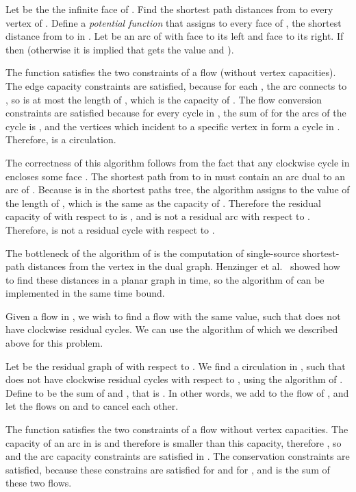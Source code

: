 \documentclass[a4paper,11pt]{article}
\begin{document}
Let  be
the the infinite face of . Find
the shortest path distances from  to every vertex of .
Define a \emph{potential function}  that assigns to every face
 of , the shortest distance from  to
 in . Let  be an arc of  with face  to its left
and face  to its right. If  then
 (otherwise it is implied that
 gets the value  and ).

The function  satisfies the two constraints of a flow \cite{KNK93} (without vertex
capacities). The edge capacity constraints are satisfied, because for each ,
the arc  connects  to , so  is
at most the length of , which is the capacity of .
The flow conversion constraints are satisfied because for every cycle in ,
the sum of  for the arcs of the cycle is  \cite{H81,J87}, and the
vertices which incident to a specific vertex in  form a cycle in .
Therefore,  is a circulation.

The correctness of this algorithm follows from the fact that any clockwise
cycle  in  encloses some face . The shortest path from 
to  in  must contain an arc 
dual to an arc  of . Because  is in the shortest paths tree, the
algorithm assigns to  the value of the length of , which is
the same as the capacity of . Therefore the residual
capacity of  with respect to  is ,
and  is not a residual arc with respect to . Therefore,  is not
a residual cycle with respect to .

The bottleneck of the algorithm of \cite{KNK93} is the
computation of single-source shortest-path distances from the vertex
 in the dual graph. Henzinger
et al.~\cite{HKRS97} showed how to find these distances in a planar
graph in  time, so the algorithm of \cite{KNK93}
can be implemented in the same time bound.

Given a flow  in , we wish to find a flow  with the same value, such
that  does not have clockwise residual cycles. We can use the algorithm
of \cite{KNK93} which we described above for this problem.

Let  be the residual graph of  with respect to . We find a
circulation  in , such that  does not have clockwise
residual cycles with respect to , using the algorithm of \cite{KNK93}. Define
 to be the sum of  and , that is .
In other words, we add to  the flow of , and let the flows
on  and  to cancel each other.

The function  satisfies the two constraints of a flow without vertex
capacities. The capacity of an arc
 in  is  and therefore  is
smaller than this capacity, therefore , so  and the arc capacity constraints are satisfied in .
The conservation constraints are satisfied, because these constrains
are satisfied for  and for , and  is the sum of these two flows.
\end{document}
